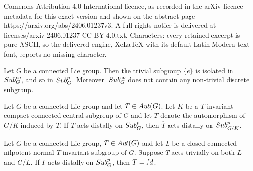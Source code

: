 \documentclass[10pt,a4paper]{amsart}
\let\ol=\overline
\newcommand{\Aut}{{\rm Aut}}
\newcommand{\Id}{{\rm Id}}
\newcommand{\Sub}{{\rm Sub}}
\newcommand{\spg}{{\rm Sub}^p_G}
\newcommand{\spp}{{\rm Sub}^{p}}
\begin{document}
Commons Attribution 4.0 International licence, as recorded in the arXiv licence metadata for this exact version and shown on the abstract page https://arxiv.org/abs/2406.01237v3. A full rights notice is delivered at licenses/arxiv-2406.01237-CC-BY-4.0.txt. Characters: every retained excerpt is pure ASCII, so the delivered engine, XeLaTeX with its default Latin Modern text font, reports no missing character.
\begin{lem} \label{discrete}
Let $G$ be a connected Lie group.  Then the trivial subgroup $\{e\}$ is isolated in $\Sub^{co}_G$, and so in $\spg$. Moreover, 
$\Sub^{co}_G$ does not contain any non-trivial discrete subgroup.
\end{lem} 

\begin{prop} \label{gk}
Let $G$ be a connected Lie group and let $T\in\Aut(G)$. Let $K$ be a $T$-invariant compact connected 
central subgroup of $G$ and let $\ol{T}$ denote the automorphism of $G/K$ induced by $T$. 
If $T$ acts distally on $\spg$, then $\ol{T}$ acts distally on $\spp_{G/K}$. 
\end{prop}

\begin{prop} \label {crux}
Let $G$ be a connected Lie group, $T\in\Aut(G)$ and let $L$ be a closed connected nilpotent normal $T$-invariant 
subgroup of $G$. Suppose $T$ acts trivially on both $L$ and $G/L$. If $T$ acts distally on $\spg$, then $T=\Id$. 
\end{prop}
\end{document}
